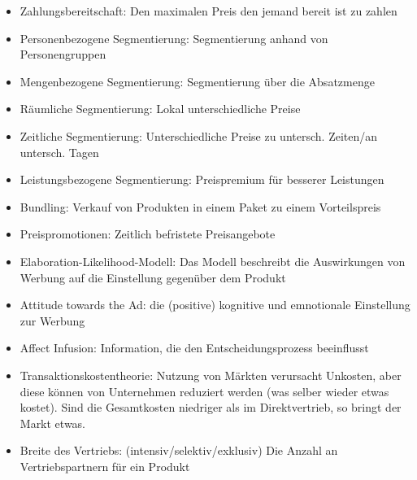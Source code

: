 \documentclass[]{article}
\begin{document}
\begin{itemize}
    \item Zahlungsbereitschaft: Den maximalen Preis den jemand bereit ist zu zahlen
    \item Personenbezogene Segmentierung: Segmentierung anhand von Personengruppen
    \item Mengenbezogene Segmentierung: Segmentierung über die Absatzmenge
    \item Räumliche Segmentierung: Lokal unterschiedliche Preise
    \item Zeitliche Segmentierung: Unterschiedliche Preise zu untersch. Zeiten/an untersch. Tagen
    \item Leistungsbezogene Segmentierung: Preispremium für besserer Leistungen
    \item Bundling: Verkauf von Produkten in einem Paket zu einem Vorteilspreis
    \item Preispromotionen: Zeitlich befristete Preisangebote
    \item Elaboration-Likelihood-Modell: Das Modell beschreibt die Auswirkungen von Werbung auf die Einstellung gegenüber dem Produkt
    \item Attitude towards the Ad: die (positive) kognitive und emnotionale Einstellung zur Werbung
    \item Affect Infusion: Information, die den Entscheidungsprozess beeinflusst
    \item Transaktionskostentheorie: Nutzung von Märkten verursacht Unkosten, aber diese können von Unternehmen reduziert werden (was selber wieder etwas kostet). Sind die Gesamtkosten niedriger als im Direktvertrieb, so bringt der Markt etwas.
    \item Breite des Vertriebs: (intensiv/selektiv/exklusiv) Die Anzahl an Vertriebspartnern für ein Produkt
\end{itemize}

\newpage

 














\end{document}

